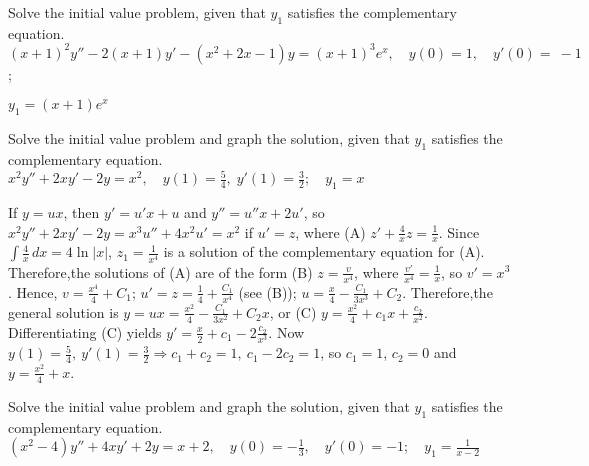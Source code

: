 \documentclass{ximera}
\begin{document}
\begin{problem}\label{exer:5.6.33}
Solve the
initial value problem, given that $y_1$ satisfies the complementary
equation. $(x+1)^2y''-2(x+1)y'-(x^2+2x-1)y=(x+1)^3e^x, \quad  y(0)=1,\quad y'(0)=~-1$;

$y_1=(x+1)e^x$
\end{problem}

\begin{problem}\label{exer:5.6.34} Solve the
initial value problem and graph the solution, given that $y_1$
satisfies the complementary equation.
$x^2y''+2xy'-2y=x^2, \quad   y(1)=\frac{5}{4},\;
y'(1)=\frac{3}{2};   \quad y_1=x$

\begin{solution}
    If $y=ux$, then $y'=u'x+u$  and $y''=u''x+2u'$, so
$x^2y''+2xy'-2y=x^3u''+4x^2u'=x^2$
if $u'=z$, where  (A) $z'+\frac{4}{ x}z=\frac{1}{ x}$.
Since $\int\frac{4}{ x}\,dx=4\ln|x|$,
$z_1=\frac{1}{ x^4}$
is a solution of the complementary equation for  (A). Therefore,the
solutions of (A) are of the form (B) $z=\frac{v}{ x^4}$, where
$\frac{v'}{ x^4}=\frac{1}{ x}$, so $v'=x^3$.
Hence, $v=\frac{x^4}{ 4}+C_1$;\;
$u'=z=\frac{1}{4}+\frac{C_1}{ x^4}$ (see (B));\;
$u=\frac{x}{4}-\frac{C_1}{3x^3}+C_2$.
 Therefore,the general solution is
$y=ux=\frac{x^2}{4}-\frac{C_1}{3x^2}+C_2x$, or
(C) $y=\frac{x^2}{4}+c_1x+\frac{c_2}{ x^2}$.
Differentiating (C) yields
 $y'=\frac{x}{2}+c_1-2\frac{c_2}{ x^3}.$
Now $y(1)=\frac{5}{4},\ y'(1)=\frac{3}{2}\Rightarrow
c_1+c_2=1,\ c_1-2c_2=1$, so $c_1=1$, $c_2=0$ and
$y=\frac{x^2}{4}+x$.

\end{solution}
\end{problem}

\begin{problem}\label{exer:5.6.35} Solve the
initial value problem and graph the solution, given that $y_1$
satisfies the complementary equation.
$(x^2-4)y''+4xy'+2y=x+2, \quad  y(0)=-\frac{1}{3},\quad y'(0)=-1;
\quad y_1=\frac{1}{x-2}$
\end{problem}
\end{document}
